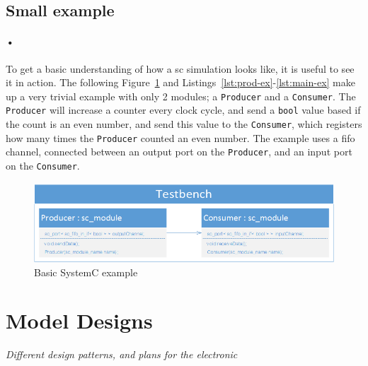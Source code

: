 \documentclass[a4paper]{report}
\newcommand{\codeword}[1]{\texttt{#1}}
\begin{document}
\newpage
\subsection{Small example}

\paragraph{•}
To get a basic understanding of how a \gls{sc} simulation looks like, it is useful to see it in action. 
The following Figure~\ref{fig:sc-ex} and Listings~\ref{lst:prod-ex}-\ref{lst:main-ex} make up a very trivial example with only 2 modules; a \codeword{Producer} and a \codeword{Consumer}.
The \codeword{Producer} will increase a counter every clock cycle, and send a \codeword{bool} value based if the count is an even number, and send this value to the \codeword{Consumer}, which registers how many times the \codeword{Producer} counted an even number.
The example uses a fifo channel, connected between an output port on the \codeword{Producer}, and an input port on the \codeword{Consumer}.

\begin{figure}[h!]
  \centering
    \includegraphics[width=1.0\textwidth]{images/sc-example.png}
     \caption{Basic SystemC example}
    \label{fig:sc-ex}
\end{figure}

\noindent
\begin{minipage}{\linewidth}

\end{minipage}
\begin{minipage}{\linewidth}

\end{minipage}
\begin{minipage}{\linewidth}

\end{minipage}


\section{Model Designs}
\textit{Different design patterns, and plans for the electronic}
\end{document}
